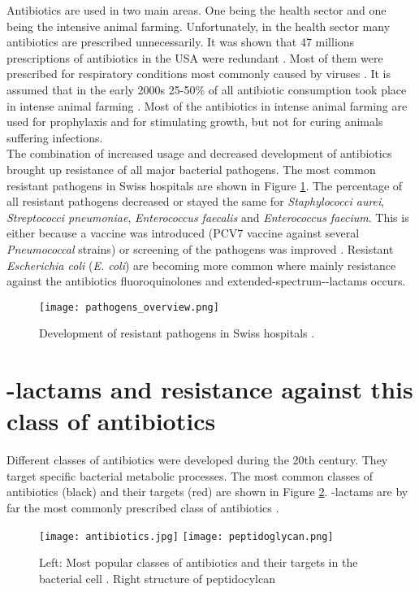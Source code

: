 Antibiotics are used in two main areas. One being the health sector and one being the intensive animal farming. Unfortunately, in the health sector many antibiotics are prescribed unnecessarily. It was shown that 47 millions prescriptions of antibiotics in the USA were redundant \cite{noauthor_antibiotic_2019}. Most of them were prescribed for respiratory conditions most commonly caused by viruses \cite{noauthor_antibiotic_2019}. It is assumed that in the early 2000s 25-50\% of all antibiotic consumption took place in intense animal farming  \cite{palumbi_humans_2001}. Most of the antibiotics in intense animal farming are used for prophylaxis and for stimulating growth, but not for curing animals suffering infections. \\
The combination of increased usage and decreased development of antibiotics brought up resistance of all major bacterial pathogens. The most common resistant pathogens in Swiss hospitals are shown in Figure \ref{figure:pathogen_dvelopment}. The percentage of all resistant pathogens decreased or stayed the same for \textit{Staphylococci aurei}, \textit{Streptococci pneumoniae}, \textit{Enterococcus faecalis} and \textit{Enterococcus faecium}. This is either because a vaccine was introduced (PCV7 vaccine against several \textit{Pneumococcal} strains) or screening of the pathogens was improved \cite{swiss_hospitals_pathogens}. Resistant \textit{Escherichia coli} (\textit{E. coli}) are becoming more common where mainly resistance against the antibiotics fluoroquinolones and extended-spectrum-\textbeta-lactams occurs. \\

\begin{figure}
	\texttt{[image: pathogens\_overview.png]}
	\caption{Development of resistant pathogens in Swiss hospitals \cite{swiss_hospitals_pathogens}.}
	\label{figure:pathogen_dvelopment}
\end{figure}

\section{\textbeta-lactams and resistance against this class of antibiotics}
Different classes of antibiotics were developed during the 20th century. They target specific bacterial metabolic processes. The most common classes of antibiotics (black) and their targets (red) are shown in Figure \ref{figure:antibiotics}. \textbeta-lactams are by far the most commonly prescribed class of antibiotics \cite{blogger_guide_2019}.
\begin{figure}
	\texttt{[image: antibiotics.jpg]}
	\texttt{[image: peptidoglycan.png]}
	\caption{Left: Most popular classes of antibiotics and their targets in the bacterial cell \cite{wright_english:_2010}. Right structure of peptidocylcan \cite{illustrator_english:_nodate}}
	\label{figure:antibiotics}
\end{figure}

